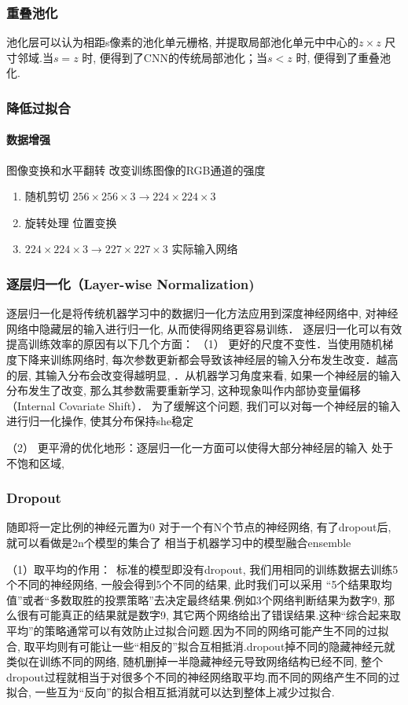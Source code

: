 \documentclass[a4paper]{article}
\theoremstyle{definition}
\numberwithin{equation}{section}
\begin{document}
\subsubsection{重叠池化}
池化层可以认为相距s像素的池化单元栅格, 并提取局部池化单元中中心的$z \times z$ 尺寸邻域.当$s=z$ 时, 便得到了CNN的传统局部池化；当$s<z$ 时, 便得到了重叠池化. 

\subsubsection{降低过拟合}
\paragraph{数据增强}
图像变换和水平翻转
改变训练图像的RGB通道的强度
\begin{enumerate}
    \item 随机剪切 $256 \times 256 \times 3  \to 224 \times 224 \times 3$ 
    \item 旋转处理 位置变换
    \item $224 \times 224 \times 3\to 227 \times 227 \times 3$  实际输入网络
\end{enumerate}

\subsubsection{逐层归一化（Layer-wise Normalization)}
逐层归一化是将传统机器学习中的数据归一化方法应用到深度神经网络中, 对神经网络中隐藏层的输入进行归一化, 从而使得网络更容易训练．
逐层归一化可以有效提高训练效率的原因有以下几个方面：
（1） 更好的尺度不变性．当使用随机梯度下降来训练网络时, 每次参数更新都会导致该神经层的输入分布发生改变．越高的层, 其输入分布会改变得越明显, ．从机器学习角度来看, 如果一个神经层的输入分布发生了改变, 那么其参数需要重新学习, 这种现象叫作内部协变量偏移（Internal Covariate Shift）． 
为了缓解这个问题, 我们可以对每一个神经层的输入进行归一化操作, 使其分布保持she稳定

（2） 更平滑的优化地形：逐层归一化一方面可以使得大部分神经层的输入
处于不饱和区域, 
\subsubsection{Dropout}
随即将一定比例的神经元置为0
对于一个有N个节点的神经网络, 有了dropout后, 就可以看做是2n个模型的集合了
相当于机器学习中的模型融合ensemble


（1）取平均的作用： 标准的模型即没有dropout, 我们用相同的训练数据去训练5个不同的神经网络, 一般会得到5个不同的结果, 此时我们可以采用 “5个结果取均值”或者“多数取胜的投票策略”去决定最终结果.例如3个网络判断结果为数字9, 那么很有可能真正的结果就是数字9, 其它两个网络给出了错误结果.这种“综合起来取平均”的策略通常可以有效防止过拟合问题.因为不同的网络可能产生不同的过拟合, 取平均则有可能让一些“相反的”拟合互相抵消.dropout掉不同的隐藏神经元就类似在训练不同的网络, 随机删掉一半隐藏神经元导致网络结构已经不同, 整个dropout过程就相当于对很多个不同的神经网络取平均.而不同的网络产生不同的过拟合, 一些互为“反向”的拟合相互抵消就可以达到整体上减少过拟合.
\end{document}
